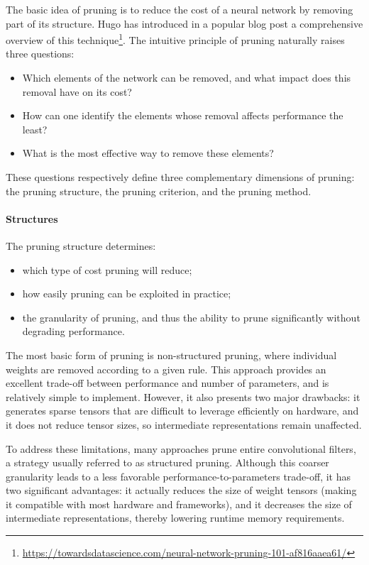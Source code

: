 \documentclass[11pt]{report}
\begin{document}
The basic idea of pruning is to reduce the cost of a neural network by removing part of its structure. Hugo has introduced in a popular blog post a comprehensive overview of this technique\footnote{\url{https://towardsdatascience.com/neural-network-pruning-101-af816aaea61/}}. The intuitive principle of pruning naturally raises three questions:
\begin{itemize}
  \item Which elements of the network can be removed, and what impact does this removal have on its cost?
  \item How can one identify the elements whose removal affects performance the least?
  \item What is the most effective way to remove these elements?
\end{itemize}
These questions respectively define three complementary dimensions of pruning: the pruning structure, the pruning criterion, and the pruning method.

\paragraph{Structures}

The pruning structure determines:
\begin{itemize}
  \item which type of cost pruning will reduce;
  \item how easily pruning can be exploited in practice;
  \item the granularity of pruning, and thus the ability to prune significantly without degrading performance.
\end{itemize}

The most basic form of pruning is non-structured pruning, where individual weights are removed according to a given rule. This approach provides an excellent trade-off between performance and number of parameters, and is relatively simple to implement. However, it also presents two major drawbacks: it generates sparse tensors that are difficult to leverage efficiently on hardware, and it does not reduce tensor sizes, so intermediate representations remain unaffected.

To address these limitations, many approaches prune entire convolutional filters, a strategy usually referred to as structured pruning. Although this coarser granularity leads to a less favorable performance-to-parameters trade-off, it has two significant advantages: it actually reduces the size of weight tensors (making it compatible with most hardware and frameworks), and it decreases the size of intermediate representations, thereby lowering runtime memory requirements.
\end{document}
